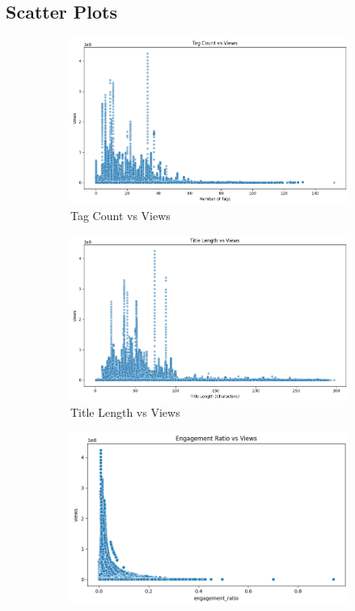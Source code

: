 \documentclass[a4paper]{article}
\begin{document}
\subsection{Scatter Plots}
\begin{figure}[h]
    \centering
        \begin{subfigure}{0.3\textwidth}
        \includegraphics[width=\linewidth]{other4.png}
        \caption{Tag Count vs Views}
        \label{fig:sub4}
    \end{subfigure}
    \hfill
    \begin{subfigure}{0.3\textwidth}
        \includegraphics[width=\linewidth]{other5.png}
        \caption{Title Length vs Views}
        \label{fig:sub5}
    \end{subfigure}
    \hfill
    \begin{subfigure}{0.3\textwidth}
        \includegraphics[width=\linewidth]{other7.png}

\end{subfigure}
\end{figure}
\end{document}
